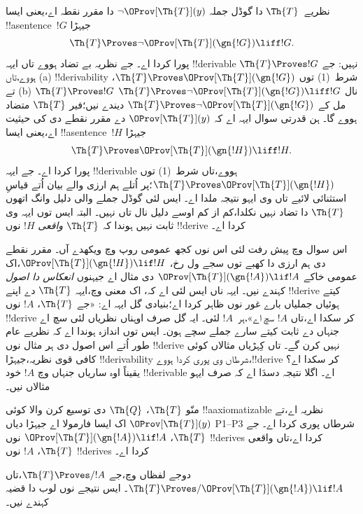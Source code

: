 \documentclass[../../../include/open-logic-section]{subfiles}
\begin{document}


نظریے~$\Th{T}$ دا گوڈل جملہ $\lnot
\OProv[\Th{T}](y)$ دا مقرر نقطہ اے،یعنی ایسا !!a{sentence}~$!G$
جیہڑا
\[
\Th{T} \Proves \lnot \OProv[\Th{T}](\gn{!G}) \liff !G.
\]
پورا کردا اے۔ جے نظریہ بے تضاد ہووے تاں ایہہ !!{derivable}
نہیں: جے $\Th{T} \Proves !G$ ہووے،تاں (a) !!{derivability}
شرط~(1) توں $\Th{T} \Proves \OProv[\Th{T}](\gn{!G})$،
تے (b) $\Th{T}
\Proves !G$ نال $\Th{T} \Proves \lnot \OProv[\Th{T}](\gn{!G})
\liff !G$ مل کے $\Th{T} \Proves \lnot
\OProv[\Th{T}](\gn{!G})$ دیندے نیں؛فیر $\Th{T}$
متضاد ہووے گا۔ ہن قدرتی سوال ایہہ اے کہ
$\OProv[\Th{T}](y)$ دے مقرر نقطے دی کی حیثیت اے،یعنی
ایسا !!a{sentence}~$!H$ جیہڑا
\[
\Th{T} \Proves \OProv[\Th{T}](\gn{!H}) \liff !H.
\]
پورا کردا اے۔ جے ایہہ !!{derivable} ہووے،تاں شرط~(1)
توں $\Th{T} \Proves \OProv[\Th{T}](\gn{!H})$؛پر اُتلے
ہم ارزی والے بیان اُتے قیاسِ استثنائی لائیے تاں وی ایہو نتیجہ
ملدا اے۔ ایس لئی گوڈل جملے والی دلیل وانگ اتھوں
$\Th{T}$ دا تضاد نہیں نکلدا،کم از کم اوسے دلیل نال تاں نہیں۔
البتہ ایس توں ایہہ وی ثابت نہیں ہوندا کہ $\Th{T}$
\emph{واقعی} $!H$ نوں !!{derive} کردا اے۔

اس سوال وچ پیش رفت لئی اس نوں کجھ عمومی روپ وچ ویکھدے آں۔
مقرر نقطے دی ہم ارزی دا کھبے توں سجے ول رخ،
$\OProv[\Th{T}](\gn{!H}) \lif !H$،اک عمومی خاکے
$\OProv[\Th{T}](\gn{!A}) \lif !A$ دی مثال اے جیہنوں
\emph{انعکاس دا اصول} کہندے نیں۔ ایہہ ناں ایس لئی اے کہ،
اک معنی وچ،ایہہ $\Th{T}$ دے اپنے !!{derive} کیتے ہوئیاں
جملیاں بارے غور نوں ظاہر کردا اے؛بنیادی گل ایہہ اے:
«جے $\Th{T}$، $!A$ نوں !!{derive} کر سکدا اے،تاں
$!A$ سچ اے»،ہر~$!A$ لئی۔ ایہ گل صرف اوہناں نظریاں لئی سچ اے جنہاں دے
ثابت کیتے سارے جملے سچے ہون۔ ایس توں اندازہ ہوندا اے کہ نظریے عام طور اُتے اس
اصول دی ہر مثال نوں !!{derive} نہیں کرن گے۔ تاں کِہڑیاں
مثالاں کوئی کافی قوی نظریہ،جیہڑا !!{derivability} شرطاں وی
پوری کردا ہووے،!!{derive} کر سکدا اے؟ یقیناً اوہ ساریاں
جنہاں وچ $!A$ خود !!{derivable} اے۔ اگلا نتیجہ دسدَا
اے کہ صرف ایہو مثالاں نیں۔

\begin{thm}
منّو $\Th{T}$، $\Th{Q}$ دی توسیع کرن والا کوئی
!!a{axiomatizable} نظریہ اے،تے
$\OProv[\Th{T}](y)$ اک ایسا فارمولا اے جیہڑا
 دیاں P1--P3 شرطاں پوری کردا اے۔ جے
$\Th{T}$، $\OProv[\Th{T}](\gn{!A}) \lif !A$ نوں
!!{derive}s کردا اے،تاں واقعی $\Th{T}$، $!A$ نوں
!!{derive}s کردا اے۔
\end{thm}

دوجے لفظاں وچ،جے $\Th{T} \Proves/ !A$،تاں
$\Th{T} \Proves/
\OProv[\Th{T}](\gn{!A}) \lif !A$۔ ایس نتیجے نوں
لوب دا قضیہ کہندے نیں۔
\end{document}
